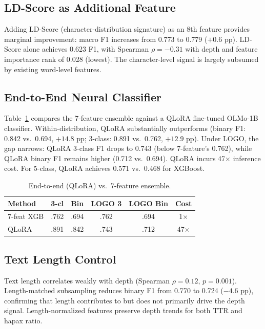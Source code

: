 \documentclass[11pt]{article}
\begin{document}
\subsection{LD-Score as Additional Feature}

Adding LD-Score (character-distribution signature) as an 8th feature provides marginal improvement: macro F1 increases from 0.773 to 0.779 ($+0.6$ pp). LD-Score alone achieves 0.623 F1, with Spearman $\rho = -0.31$ with depth and feature importance rank of 0.028 (lowest). The character-level signal is largely subsumed by existing word-level features.

\subsection{End-to-End Neural Classifier}
\label{sec:e2e}

Table~\ref{tab:e2e} compares the 7-feature ensemble against a QLoRA fine-tuned OLMo-1B classifier. Within-distribution, QLoRA substantially outperforms (binary F1: 0.842 vs.\ 0.694, $+14.8$ pp; 3-class: 0.891 vs.\ 0.762, $+12.9$ pp). Under LOGO, the gap narrows: QLoRA 3-class F1 drops to 0.743 (below 7-feature's 0.762), while QLoRA binary F1 remains higher (0.712 vs.\ 0.694). QLoRA incurs 47$\times$ inference cost. For 5-class, QLoRA achieves 0.571 vs.\ 0.468 for XGBoost.

\begin{table}[t]
\centering
\small
\caption{End-to-end (QLoRA) vs.\ 7-feature ensemble.}
\label{tab:e2e}
\begin{tabular}{lccccc}
\toprule
\textbf{Method} & \textbf{3-cl} & \textbf{Bin} & \textbf{LOGO 3} & \textbf{LOGO Bin} & \textbf{Cost} \\
\midrule
7-feat XGB & .762 & .694 & .762 & .694 & 1$\times$ \\
QLoRA & .891 & .842 & .743 & .712 & 47$\times$ \\
\bottomrule
\end{tabular}
\end{table}

\subsection{Text Length Control}
\label{sec:length}

Text length correlates weakly with depth (Spearman $\rho = 0.12$, $p = 0.001$). Length-matched subsampling reduces binary F1 from 0.770 to 0.724 ($-4.6$ pp), confirming that length contributes to but does not primarily drive the depth signal. Length-normalized features preserve depth trends for both TTR and hapax ratio.
\end{document}
